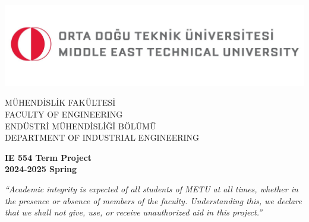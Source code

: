 
\begin{titlepage}
    \begin{center}
        \begin{minipage}{0.9\linewidth}
            \includegraphics[width=\linewidth]{cover-page/images/white_bg_tr_en.jpg}
            \hspace*{6.4em}
            \parbox[h]{0.7\textwidth}{
                \singlespacing
                \footnotesize\color{logogray}\ttfamily
                \vspace*{-1.6cm}
                MÜHENDİSLİK FAKÜLTESİ\\
                FACULTY OF ENGINEERING\\
                ENDÜSTRİ MÜHENDİSLİĞİ BÖLÜMÜ\\
                DEPARTMENT OF INDUSTRIAL ENGINEERING}
        \end{minipage}
        \vspace{4cm}

        \huge{\textbf{IE 554 Term Project}}\\
        \LARGE{\textbf{2024-2025 Spring}}\\
        \vspace{3cm}

        \parbox{0.9\textwidth}{\normalsize\it
        “Academic integrity is expected of all students of METU at all times, whether in the presence or absence of members of the faculty. Understanding this, we declare that we shall not give, use, or receive unauthorized aid in this project.”
        }
        \vspace{1.5cm}


\end{center}
\end{titlepage}
